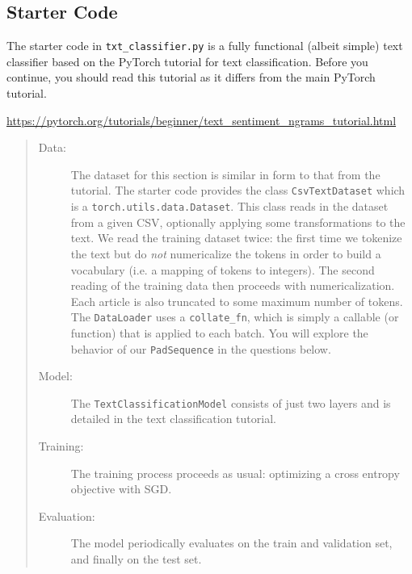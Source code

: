 \documentclass[11pt,addpoints,answers]{exam}
\begin{document}
\begin{questions}
\subsection*{Starter Code}

The starter code in \lstinline{txt_classifier.py} is a fully functional (albeit simple) text classifier based on the PyTorch tutorial for text classification. Before you continue, you should read this tutorial as it differs from the main PyTorch tutorial.
\begin{center}
{\small
\url{https://pytorch.org/tutorials/beginner/text_sentiment_ngrams_tutorial.html}
}
\end{center}

\begin{quote}
\begin{description}

\item[Data:] The dataset for this section is similar in form to that from the tutorial. The starter code provides the class \lstinline{CsvTextDataset} which is a \lstinline{torch.utils.data.Dataset}. This class reads in the dataset from a given CSV, optionally applying some transformations to the text. 
%
We read the training dataset twice: the first time we tokenize the text but do \emph{not} numericalize the tokens in order to build a vocabulary (i.e. a mapping of tokens to integers). The second reading of the training data then proceeds with numericalization. Each article is also truncated to some maximum number of tokens.
%
The \lstinline{DataLoader} uses a \lstinline{collate_fn}, which is simply a callable (or function) that is applied to each batch. You will explore the behavior of our \lstinline{PadSequence} in the questions below.

\item[Model:] The \lstinline{TextClassificationModel} consists of just two layers and is detailed in the text classification tutorial. 

\item[Training:] The training process proceeds as usual: optimizing a cross entropy objective with SGD. 

\item[Evaluation:] The model periodically evaluates on the train and validation set, and finally on the test set. 
    
\end{description}
    
\end{quote}


\end{questions}
\end{document}
